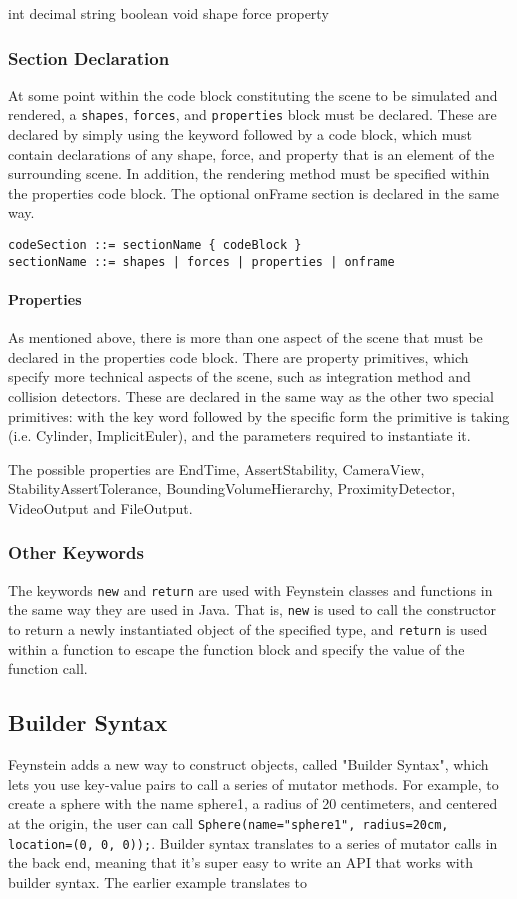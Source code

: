\documentclass[letterpaper]{article}
\newcommand\subsubsubsection[1]{\paragraph{#1}}
\begin{document}
int decimal string boolean void shape force property

\subsubsection{Section Declaration}

At some point within the code block constituting the scene to be
simulated and rendered, a \texttt{shapes}, \texttt{forces}, and \texttt{properties} block
must be declared.  These are declared by simply using the keyword
followed by a code block, which must contain declarations of any
shape, force, and property that is an element of the surrounding
scene.  In addition, the rendering method must be specified within the
properties code block.  The optional onFrame section is declared in
the same way.

\begin{verbatim}
codeSection ::= sectionName { codeBlock }
sectionName ::= shapes | forces | properties | onframe
\end{verbatim}

\subsubsubsection{Properties}

As mentioned above, there is more than one aspect of the scene that
must be declared in the properties code block.  There are property
primitives, which specify more technical aspects of the scene, such as
integration method and collision detectors.  These are declared in the
same way as the other two special primitives: with the key word
followed by the specific form the primitive is taking (i.e. Cylinder,
ImplicitEuler), and the parameters required to instantiate it.

The possible properties are EndTime, AssertStability, CameraView,
StabilityAssertTolerance, BoundingVolumeHierarchy, ProximityDetector,
VideoOutput and FileOutput.

\subsubsection{Other Keywords}

The keywords \texttt{new} and \texttt{return} are used with Feynstein
classes and functions in the same way they are used in Java.  That is,
\texttt{new} is used to call the constructor to return a newly
instantiated object of the specified type, and \texttt{return} is used
within a function to escape the function block and specify the value
of the function call.

\subsection{Builder Syntax}
Feynstein adds a new way to construct objects, called "Builder
Syntax", which lets you use key-value pairs to call a series of
mutator methods. For example, to create a sphere with the name
sphere1, a radius of 20 centimeters, and centered at the origin, the
user can call \texttt{Sphere(name="sphere1", radius=20cm, location=(0, 0,
0));}. Builder syntax translates to a series of mutator calls in the
back end, meaning that it's super easy to write an API that works with
builder syntax. The earlier example translates to 
\end{document}
